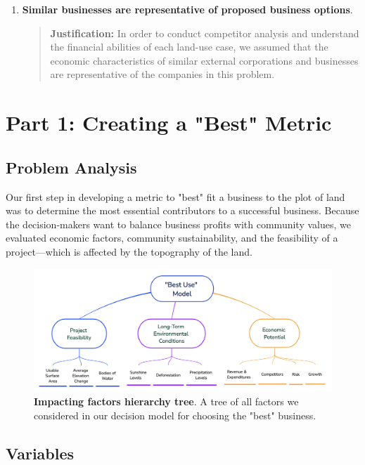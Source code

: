 \documentclass{mcmthesis}
\begin{document}
\begin{enumerate}
    \item \textbf{Similar businesses are representative of proposed business options}.
    \begin{quote}
        \textbf{Justification:} In order to conduct competitor analysis and understand the financial abilities of each land-use case, we assumed that the economic characteristics of similar external corporations and businesses are representative of the companies in this problem. 
    \end{quote}
\end{enumerate}

\section{Part 1: Creating a "Best" Metric}

\subsection{Problem Analysis}

Our first step in developing a metric to "best" fit a business to the plot of land was to determine the most essential contributors to a successful business. Because the decision-makers want to balance business profits with community values, we evaluated economic factors, community sustainability, and the feasibility of a project---which is affected by the topography of the land.

\begin{figure}[!htbp]
\centering
    \includegraphics[scale=0.5]{figures/mindmap.png}
    \captionsetup{width=0.8\textwidth}
    \caption{\textbf{Impacting factors hierarchy tree}. A tree of all factors we considered in our decision model for choosing the "best" business. }
    \label{fig:factormindmap}
\end{figure}

\newpage
\subsection{Variables}
\end{document}

